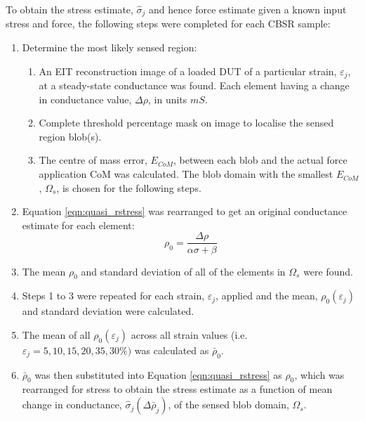 To obtain the stress estimate, $\hat\sigma_j$ and hence force estimate given a known input stress and force, the following steps were completed for each CBSR sample:
\begin{enumerate}
    \item Determine the most likely sensed region:
    \begin{enumerate}
        \item An EIT reconstruction image of a loaded DUT of a particular strain, $\varepsilon_j$, at a steady-state conductance was found. Each element having a change in conductance value, $\Delta\rho$, in units $mS$.
        \item Complete threshold percentage mask on image to localise the sensed region blob(s).
        \item The centre of mass error, $E_{CoM}$, between each blob and the actual force application CoM was calculated. The blob domain with the smallest $E_{CoM}$, $\Omega_s$, is chosen for the following steps.
    \end{enumerate}
    \item Equation \ref{eqn:quasi_rstress} was rearranged to get an original conductance estimate for each element:
    \begin{equation}
        \rho_0 = \frac{\Delta \rho}{\alpha \sigma+\beta}
        \label{eqn:C0_est_stress}
    \end{equation}
    \item The mean $\rho_0$ and standard deviation of all of the elements in $\Omega_s$ were found.
    \item Steps 1 to 3 were repeated for each strain, $\varepsilon_j$, applied and the mean, $\rho_0(\varepsilon_j)$ and standard deviation  were calculated.
    \item The mean of all $\rho_0(\varepsilon_j)$ across all strain values (i.e. $\varepsilon_j = 5, 10, 15, 20, 35, 30\%)$ was calculated as $\bar\rho_0$.
    \item $\bar\rho_0$ was then substituted into Equation \ref{eqn:quasi_rstress} as $\rho_0$, which was rearranged for stress to obtain the stress estimate as a function of mean change in conductance, $\hat\sigma_j(\Delta \bar\rho_j)$, of the sensed blob domain, $\Omega_s$.
\end{enumerate}


